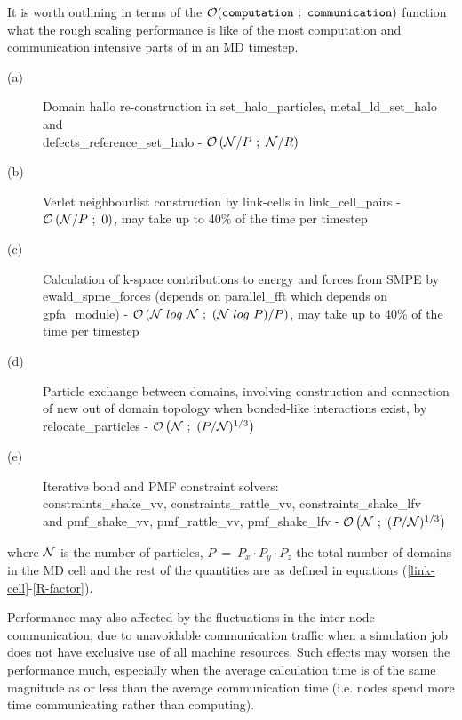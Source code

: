 It is worth outlining in terms of the
${\cal O}({\tt computation~;~communication})$ function what the
rough scaling performance is like of the most computation and
communication intensive parts of \D in an MD timestep.
\begin{description}
\item[(a)] Domain hallo re-construction in {\sc set\_halo\_particles},
{\sc metal\_ld\_set\_halo} and \\ {\sc defects\_reference\_set\_halo} -
${\cal O}\left({\cal N}/P~;~{\cal N}/R\right)$
\item[(b)] Verlet neighbourlist construction by link-cells in
{\sc link\_cell\_pairs} - ${\cal O}\left({\cal N}/P~;~0\right)$,
may take up to 40\% of the time per timestep
\item[(c)] Calculation of k-space contributions to energy and forces
from SMPE by {\sc ewald\_spme\_forces} (depends on {\sc parallel\_fft}
which depends on {\sc gpfa\_module}) -
${\cal O}\left({\cal N}~{\normalfont log}~{\cal N}~;~({\cal N}~{\normalfont log}~P)/P\right)$,
may take up to 40\% of the time per timestep
\item[(d)] Particle exchange between domains, involving construction
and connection of new out of domain topology when bonded-like
interactions exist, by {\sc relocate\_particles} -
${\cal O}\left({\cal N}~;~(P/{\cal N})^{1/3}\right)$
\item[(e)] Iterative bond and PMF constraint solvers: \\
{\sc constraints\_shake\_vv}, {\sc constraints\_rattle\_vv}, {\sc constraints\_shake\_lfv} \\
and {\sc pmf\_shake\_vv}, {\sc pmf\_rattle\_vv}, {\sc pmf\_shake\_lfv} -
${\cal O}\left({\cal N}~;~(P/{\cal N})^{1/3}\right)$
\end{description}
where ${\cal N}$ is the number of particles, $P~=~P_{x} \cdot P_{y} \cdot P_{z}$
the total number of domains in the MD cell and the rest of the quantities
are as defined in equations (\ref{link-cell}-\ref{R-factor}).

Performance may also affected by the fluctuations in the inter-node
communication, due to unavoidable communication traffic when a
simulation job does not have exclusive use of all machine resources.
Such effects may worsen the performance much, especially when the
average calculation time is of the same magnitude as or less than
the average communication time (i.e. nodes spend more time
communicating rather than computing).
